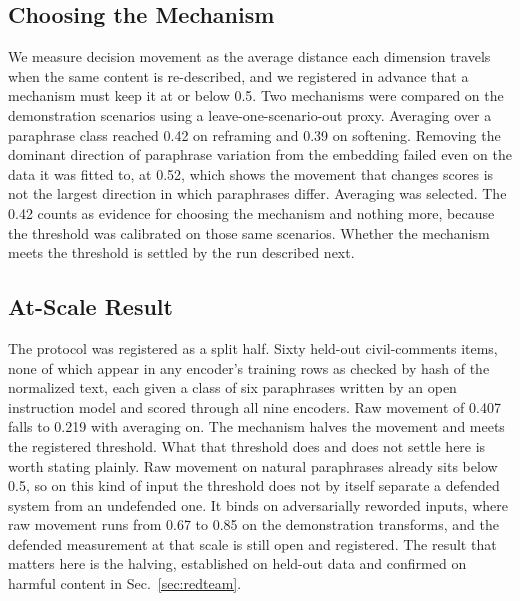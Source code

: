 \documentclass[journal]{IEEEtran}
\begin{document}
\subsection{Choosing the Mechanism}
\label{sec:mechanism}

We measure decision movement as the average distance each dimension travels
when the same content is re-described, and we registered in advance that a
mechanism must keep it at or below 0.5. Two mechanisms were compared on the
demonstration scenarios using a leave-one-scenario-out proxy. Averaging over
a paraphrase class reached 0.42 on reframing and 0.39 on softening. Removing
the dominant direction of paraphrase variation from the embedding failed even
on the data it was fitted to, at 0.52, which shows the movement that changes
scores is not the largest direction in which paraphrases differ. Averaging
was selected. The 0.42 counts as evidence for choosing the mechanism and
nothing more, because the threshold was calibrated on those same scenarios.
Whether the mechanism meets the threshold is settled by the run described
next.

\subsection{At-Scale Result}
\label{sec:atscale}

The protocol was registered as a split half. Sixty held-out civil-comments
items, none of which appear in any encoder's training rows as checked by hash
of the normalized text, each given a class of six paraphrases written by an
open instruction model and scored through all nine encoders. Raw movement of
0.407 falls to 0.219 with averaging on. The mechanism halves the movement and
meets the registered threshold. What that threshold does and does not settle
here is worth stating plainly. Raw movement on natural paraphrases already
sits below 0.5, so on this kind of input the threshold does not by itself
separate a defended system from an undefended one. It binds on
adversarially reworded inputs, where raw movement runs from 0.67 to 0.85 on
the demonstration transforms, and the defended measurement at that scale is
still open and registered. The result that matters here is the halving,
established on held-out data and confirmed on harmful content in
Sec.~\ref{sec:redteam}.
\end{document}
